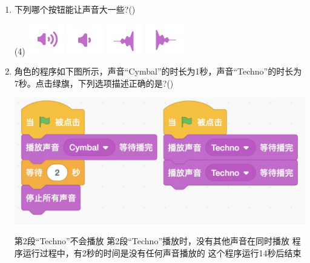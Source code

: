 \documentclass[10pt, a4paper]{article}
\begin{document}
\begin{enumerate}
        \item 下列哪个按钮能让声音大一些?(\qquad)
        \begin{tasks}(4)
            \task \includegraphics[width=.05\textwidth]{18a.jpg}
            \task \includegraphics[width=.05\textwidth]{18b.jpg}
            \task \includegraphics[width=.05\textwidth]{18c.jpg}
            \task \includegraphics[width=.05\textwidth]{18d.jpg}
        \end{tasks}

        \item 角色的程序如下图所示，声音“Cymbal”的时长为1秒，声音“Techno”的时长为7秒。点击绿旗，下列选项描述正确的是?(\qquad)
        
        \begin{minipage}{.37\textwidth}
            \includegraphics[width=\textwidth]{19.jpg}
        \end{minipage}
        \begin{minipage}{.57\textwidth}
            \begin{tasks}
                \task 第2段“Techno”不会播放
                \task 第2段“Techno”播放时，没有其他声音在同时播放
                \task 程序运行过程中，有2秒的时间是没有任何声音播放的
                \task 这个程序运行14秒后结束
            \end{tasks}
        \end{minipage}
        


\end{enumerate}
\end{document}
